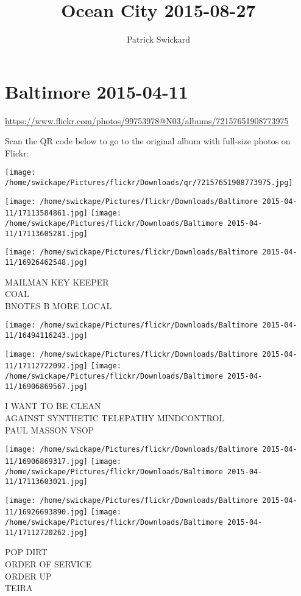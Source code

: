 \documentclass[10pt,letterpaper]{article}
\title{Ocean City 2015-08-27}
\author{Patrick Swickard}
\date{}
\begin{document}
\section*{Baltimore 2015-04-11}

\url{https://www.flickr.com/photos/99753978@N03/albums/72157651908773975}

Scan the QR code below to go to the original album with full-size photos on Flickr:

\texttt{[image: /home/swickape/Pictures/flickr/Downloads/qr/72157651908773975.jpg]}
\pagebreak

\texttt{[image: /home/swickape/Pictures/flickr/Downloads/Baltimore 2015-04-11/17113584861.jpg]}
\texttt{[image: /home/swickape/Pictures/flickr/Downloads/Baltimore 2015-04-11/17113605281.jpg]}

\texttt{[image: /home/swickape/Pictures/flickr/Downloads/Baltimore 2015-04-11/16926462548.jpg]}

MAILMAN KEY KEEPER\\
COAL\\
BNOTES B MORE LOCAL
\pagebreak

\texttt{[image: /home/swickape/Pictures/flickr/Downloads/Baltimore 2015-04-11/16494116243.jpg]}

\vspace{0.25in}
\texttt{[image: /home/swickape/Pictures/flickr/Downloads/Baltimore 2015-04-11/17112722092.jpg]}
\texttt{[image: /home/swickape/Pictures/flickr/Downloads/Baltimore 2015-04-11/16906869567.jpg]}

I WANT TO BE CLEAN\\
AGAINST SYNTHETIC TELEPATHY MINDCONTROL\\
PAUL MASSON VSOP
\pagebreak

\texttt{[image: /home/swickape/Pictures/flickr/Downloads/Baltimore 2015-04-11/16906869317.jpg]}
\texttt{[image: /home/swickape/Pictures/flickr/Downloads/Baltimore 2015-04-11/17113603021.jpg]}

\texttt{[image: /home/swickape/Pictures/flickr/Downloads/Baltimore 2015-04-11/16926693890.jpg]}
\texttt{[image: /home/swickape/Pictures/flickr/Downloads/Baltimore 2015-04-11/17112720262.jpg]}

POP DIRT\\
ORDER OF SERVICE\\
ORDER UP\\
TEIRA
\pagebreak
\end{document}
